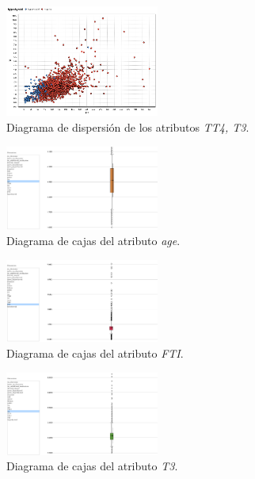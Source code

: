 \documentclass[osajnl,twocolumn,showpacs,superscriptaddress,10pt,floatfix]{revtex4-1} %
\begin{document}
\begin{figure}[H]
    \centering
    \includegraphics[width=0.45\textwidth]{analysis/scatter_TT4_T3}
    \caption{Diagrama de dispersión de los atributos \textit{TT4, T3}.}
    \label{figure:scatter_TT4_T3}
\end{figure}

\begin{figure}[H]
    \centering
    \includegraphics[width=0.45\textwidth]{analysis/box_plot_age}
    \caption{Diagrama de cajas del atributo \textit{age}.}
    \label{figure:box_plot_age}
\end{figure}

\begin{figure}[H]
    \centering
    \includegraphics[width=0.45\textwidth]{analysis/box_plot_FTI}
    \caption{Diagrama de cajas del atributo \textit{FTI}.}
    \label{figure:box_plot_FTI}
\end{figure}

\begin{figure}[H]
    \centering
    \includegraphics[width=0.45\textwidth]{analysis/box_plot_T3}
    \caption{Diagrama de cajas del atributo \textit{T3}.}
    \label{figure:box_plot_T3}
\end{figure}
\end{document}
